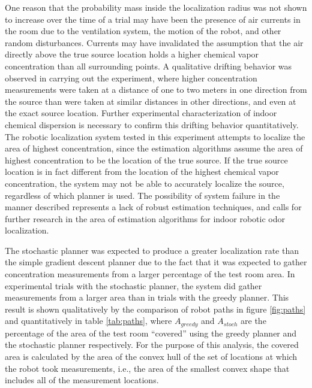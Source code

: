 \documentclass[submit, 12pt]{aiaa-pretty-modified}
\begin{document}
One reason that the probability mass inside the localization
radius was not shown to increase over the time of a trial may have been
the presence of air currents in the room due to the ventilation
system, the motion of the robot, and other random disturbances. Currents may have invalidated the
assumption that the air directly above the true source location
holds a higher chemical vapor concentration than all surrounding
points.  A qualitative drifting behavior was observed in carrying out
the experiment, where higher concentration measurements were taken
at a distance of one to two meters in one direction from the source than were
taken at similar distances in other directions, and even at the exact
source location.  Further experimental characterization of indoor
chemical dispersion is necessary to confirm this drifting
behavior quantitatively.  The robotic localization system tested in
this experiment attempts to localize the area of highest
concentration, since the estimation algorithms assume the area of highest
concentration to be the location of the true source.  If the true
source location is in fact different from the location of the
highest chemical vapor concentration, the system may not be able to accurately
localize the source, regardless of which planner is used.  The
possibility of system failure in the manner described represents a lack of robust estimation techniques, and
calls for further research in the area of estimation algorithms for
indoor robotic odor localization.

The stochastic planner was expected to produce a greater localization
rate than the simple gradient descent planner due to the fact that it
was expected to gather concentration measurements from a larger
percentage of the test room area.  In experimental trials with the
stochastic planner, the system did gather measurements from a larger
area than in trials with the greedy planner.  This result is shown
qualitatively by the comparison of robot paths in figure \ref{fig:paths} and
quantitatively in table \ref{tab:paths}, where $A_{greedy}$ and
$A_{stoch}$ are the percentage of the area of the test room ``covered''
using the greedy planner and the stochastic planner respectively.  For
the purpose of this analysis, the covered area is calculated by the
area of the convex hull
of the set of locations at which the robot took measurements, i.e., the area of
the smallest convex shape that includes all of the measurement locations.
\end{document}

